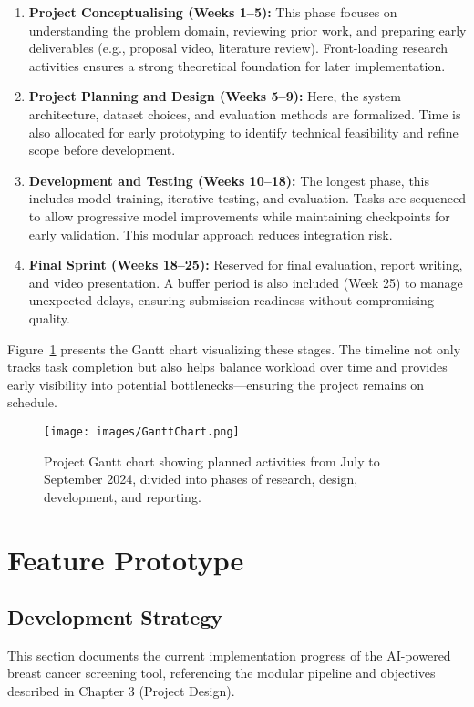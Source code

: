 \documentclass[12pt]{article}
\begin{document}
\begin{enumerate}
    \item \textbf{Project Conceptualising (Weeks 1–5):} This phase focuses on understanding the problem domain, reviewing prior work, and preparing early deliverables (e.g., proposal video, literature review). Front-loading research activities ensures a strong theoretical foundation for later implementation.

    \item \textbf{Project Planning and Design (Weeks 5–9):} Here, the system architecture, dataset choices, and evaluation methods are formalized. Time is also allocated for early prototyping to identify technical feasibility and refine scope before development.

    \item \textbf{Development and Testing (Weeks 10–18):} The longest phase, this includes model training, iterative testing, and evaluation. Tasks are sequenced to allow progressive model improvements while maintaining checkpoints for early validation. This modular approach reduces integration risk.

    \item \textbf{Final Sprint (Weeks 18–25):} Reserved for final evaluation, report writing, and video presentation. A buffer period is also included (Week 25) to manage unexpected delays, ensuring submission readiness without compromising quality.
\end{enumerate}

Figure~\ref{fig:gantt} presents the Gantt chart visualizing these stages. The timeline not only tracks task completion but also helps balance workload over time and provides early visibility into potential bottlenecks—ensuring the project remains on schedule.

\begin{figure}[H]
    \centering
    \texttt{[image: images/GanttChart.png]}
    \caption{Project Gantt chart showing planned activities from July to September 2024, divided into phases of research, design, development, and reporting.}
    \label{fig:gantt}
\end{figure}

\newpage
\section{Feature Prototype}

\subsection{Development Strategy}
This section documents the current implementation progress of the AI-powered breast cancer screening tool, referencing the modular pipeline and objectives described in Chapter 3 (Project Design).
\end{document}
